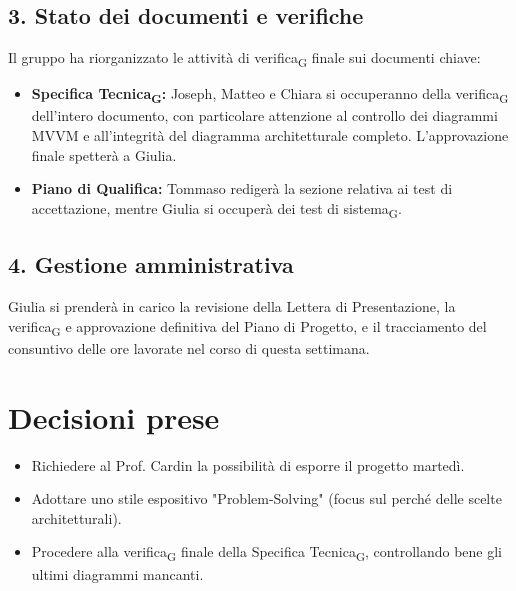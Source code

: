 \documentclass[a4paper,12pt]{article}
\newcommand{\gls}[1]{#1\textsubscript{G}}
\begin{document}
\subsection*{3. Stato dei documenti e verifiche}
Il gruppo ha riorganizzato le attività di \gls{verifica} finale sui documenti chiave:
\begin{itemize}
    \item \textbf{\gls{Specifica Tecnica}:} Joseph, Matteo e Chiara si occuperanno della \gls{verifica} dell'intero documento, con particolare attenzione al controllo dei diagrammi MVVM e all'integrità del diagramma architetturale completo. L'approvazione finale spetterà a Giulia.
    \item \textbf{Piano di Qualifica:} Tommaso redigerà la sezione relativa ai test di accettazione, mentre Giulia si occuperà dei \gls{test di sistema}.
\end{itemize}

\subsection*{4. Gestione amministrativa}
Giulia si prenderà in carico la revisione della Lettera di Presentazione, la \gls{verifica} e approvazione definitiva del Piano di Progetto, e il tracciamento del consuntivo delle ore lavorate nel corso di questa settimana.


\section*{Decisioni prese}
\begin{itemize}
    \item Richiedere al Prof. Cardin la possibilità di esporre il progetto martedì.
    \item Adottare uno stile espositivo "Problem-Solving" (focus sul perché delle scelte architetturali).
    \item Procedere alla \gls{verifica} finale della \gls{Specifica Tecnica}, controllando bene gli ultimi diagrammi mancanti.
\end{itemize}
\end{document}
